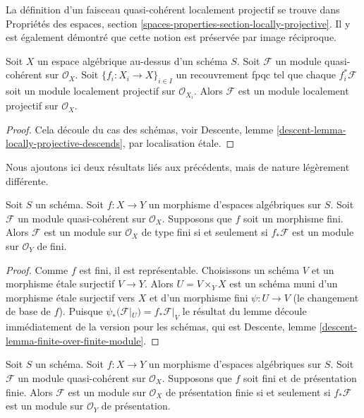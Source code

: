 \noindent
La définition d'un faisceau quasi-cohérent localement projectif se trouve dans
Propriétés des espaces, section
\ref{spaces-properties-section-locally-projective}.
Il y est également démontré que cette notion est préservée par image réciproque.

\begin{lemma}
\label{lemma-locally-projective-descends}
Soit $X$ un espace algébrique au-dessus d'un schéma $S$.
Soit $\mathcal{F}$ un module quasi-cohérent sur $\mathcal{O}_X$.
Soit $\{f_i : X_i \to X\}_{i \in I}$ un recouvrement fpqc tel que
chaque $f_i^*\mathcal{F}$ soit un module localement projectif sur $\mathcal{O}_{X_i}$.
Alors $\mathcal{F}$ est un module localement projectif sur $\mathcal{O}_X$.
\end{lemma}

\begin{proof}
Cela découle du cas des schémas, voir
Descente, lemme \ref{descent-lemma-locally-projective-descends},
par localisation \'etale.
\end{proof}

\noindent
Nous ajoutons ici deux résultats liés aux précédents, mais
de nature légèrement différente.

\begin{lemma}
\label{lemma-finite-over-finite-module}
Soit $S$ un schéma.
Soit $f : X \to Y$ un morphisme d'espaces algébriques sur $S$.
Soit $\mathcal{F}$ un module quasi-cohérent sur $\mathcal{O}_X$.
Supposons que $f$ soit un morphisme fini.
Alors $\mathcal{F}$ est un module sur $\mathcal{O}_X$ de type fini
si et seulement si $f_*\mathcal{F}$ est un module sur $\mathcal{O}_Y$ de
fini.
\end{lemma}

\begin{proof}
Comme $f$ est fini, il est représentable. Choisissons un schéma $V$ et un
morphisme \'etale surjectif $V \to Y$. Alors $U = V \times_Y X$ est un schéma muni d'un
morphisme \'etale surjectif vers $X$ et d'un morphisme fini
$\psi : U \to V$ (le changement de base de $f$). Puisque
$\psi_*(\mathcal{F}|_U) = f_*\mathcal{F}|_V$
le résultat du lemme découle immédiatement de la version pour les schémas, qui
est
Descente, lemme \ref{descent-lemma-finite-over-finite-module}.
\end{proof}

\begin{lemma}
\label{lemma-finite-finitely-presented-module}
Soit $S$ un schéma.
Soit $f : X \to Y$ un morphisme d'espaces algébriques sur $S$.
Soit $\mathcal{F}$ un module quasi-cohérent sur $\mathcal{O}_X$.
Supposons que $f$ soit fini et de présentation finie.
Alors $\mathcal{F}$ est un module sur $\mathcal{O}_X$ de présentation finie
si et seulement si $f_*\mathcal{F}$ est un module sur $\mathcal{O}_Y$ de
présentation.
\end{lemma}

